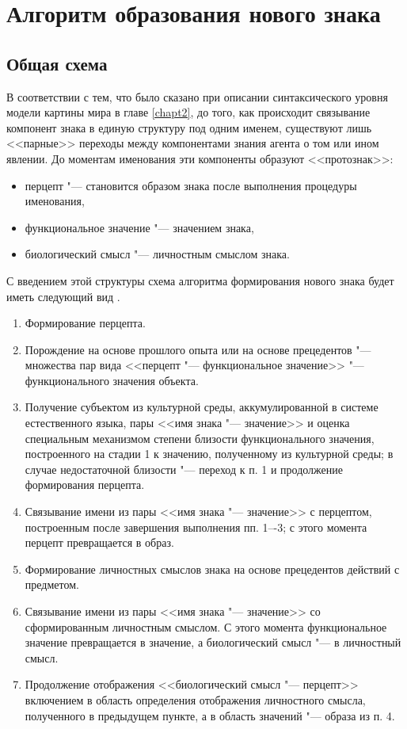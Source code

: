 \section{Алгоритм образования нового знака} \label{sect3_3}

\subsection{Общая схема}

В соответствии с тем, что было сказано при описании синтаксического уровня модели картины мира в главе \ref{chapt2}, до того, как происходит связывание компонент знака в единую структуру под одним именем, существуют лишь <<парные>> переходы между компонентами знания агента о том или ином явлении. До моментам именования эти компоненты образуют <<протознак>>:
\begin{itemize}
	\item перцепт "--- становится образом знака после выполнения процедуры именования,
	\item функциональное значение "--- значением знака,
	\item биологический смысл "--- личностным смыслом знака.
	\end{itemize}
	
С введением этой структуры схема алгоритма формирования нового знака будет иметь следующий вид \cite{PanovA2014a}.

\begin{enumerate}
	\label{new_sign_alg}
	\renewcommand\labelenumi{\theenumi .}
	\item Формирование перцепта.
	\item Порождение на основе прошлого опыта или на основе прецедентов "--- множества пар вида <<перцепт "--- функциональное значение>> "--- функционального значения объекта.
	\item Получение субъектом из культурной среды, аккумулированной в системе естественного языка, пары <<имя знака "--- значение>> и оценка специальным механизмом степени близости функционального значения, построенного на стадии 1 к значению, полученному из культурной среды; в случае недостаточной близости "--- переход к п. 1 и продолжение формирования перцепта.
	\item Связывание имени из пары <<имя знака "--- значение>> с перцептом, построенным после завершения выполнения пп. 1–-3; с этого момента перцепт превращается в образ.
	\item Формирование личностных смыслов знака на основе прецедентов действий с предметом.
	\item Связывание имени из пары <<имя знака "--- значение>> со сформированным личностным смыслом. С этого момента функциональное значение превращается в значение, а биологический смысл "--- в личностный смысл.
	\item Продолжение отображения <<биологический смысл "--- перцепт>> включением в область определения отображения личностного смысла, полученного в предыдущем пункте, а в область значений "--- образа из п. 4.
\end{enumerate}

